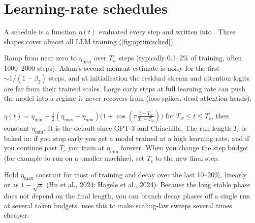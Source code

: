 \section{Learning-rate schedules}\label{sec:optim:sched}

A schedule is a function $\eta(t)$ evaluated every step and written into
. Three shapes cover almost all LLM training (\cref{fig:optim:sched}).

\begin{description}[leftmargin=1.2em, style=nextline]
  \item[Linear warmup.] Ramp from near zero to $\eta_{\max}$ over $T_w$ steps (typically
    0.1--2\% of training, often 1000--2000 steps). Adam's second-moment estimate is noisy for
    the first $\sim 1/(1-\beta_2)$ steps, and at initialisation the residual stream and attention
    logits are far from their trained scales. Large early steps at full learning rate can push
    the model into a regime it never recovers from (loss spikes, dead attention heads).
  \item[Cosine decay.] $\eta(t) = \eta_{\min} + \tfrac12(\eta_{\max}-\eta_{\min})
    \bigl(1+\cos(\pi\frac{t-T_w}{T_c-T_w})\bigr)$ for $T_w\le t\le T_c$, then constant
    $\eta_{\min}$. It is the default since GPT-3 and Chinchilla. The run length $T_c$ is baked in:
    if you stop early you get a model trained at a high learning rate, and if you continue past
    $T_c$ you train at $\eta_{\min}$ forever. When you change the step budget (for example to run
    on a smaller machine), set $T_c$ to the new final step.
  \item[Warmup--stable--decay (WSD).] Hold $\eta_{\max}$ constant for most of training and decay
    over the last 10--20\%, linearly or as $1-\sqrt{x}$ (Hu et al., 2024; H\"agele et al., 2024).
    Because the long stable phase does not depend on the final length, you can branch decay
    phases off a single run at several token budgets.  uses this to make
    scaling-law sweeps several times cheaper.
\end{description}

